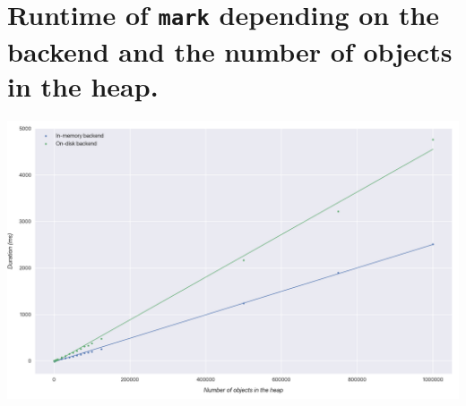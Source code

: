 \section{Runtime of \texttt{mark} depending on the backend and the number of objects in the heap.}
\label{app:mark-benchmark}

\centering
\includegraphics[width=\textwidth]{images/mark_bench.png}

